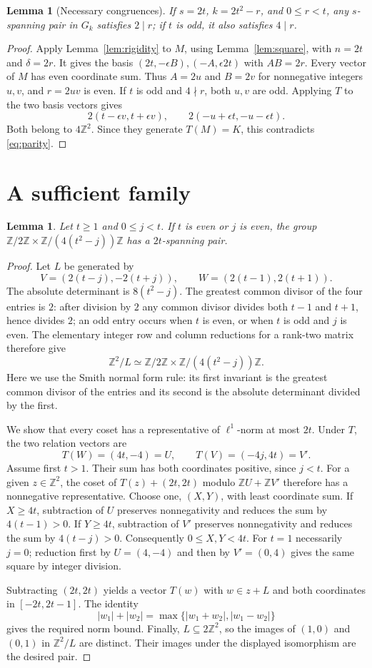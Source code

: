 \documentclass[11pt]{article}
\newtheorem{lemma}[theorem]{Lemma}
\newcommand{\Z}{\mathbb Z}
\newcommand{\Gk}{G_k}
\begin{document}
\begin{lemma}[Necessary congruences]\label{lem:necessity}
If $s=2t$, $k=2t^2-r$, and $0\le r<t$, any $s$-spanning pair in
$\Gk$ satisfies $2\mid r$; if $t$ is odd, it also satisfies $4\mid r$.
\end{lemma}
\begin{proof}
Apply Lemma~\ref{lem:rigidity} to $M$, using Lemma~\ref{lem:square},
with $n=2t$ and $\delta=2r$. It gives the basis
$(2t,-\epsilon B),(-A,\epsilon2t)$ with $AB=2r$.
Every vector of $M$ has even coordinate sum. Thus $A=2u$ and $B=2v$
for nonnegative integers $u,v$, and $r=2uv$ is even.
If $t$ is odd and $4\nmid r$, both $u,v$ are odd. Applying $T$ to
the two basis vectors gives
\[
2(t-\epsilon v,t+\epsilon v),\qquad
2(-u+\epsilon t,-u-\epsilon t).
\]
Both belong to $4\Z^2$. Since they generate $T(M)=K$, this contradicts
\eqref{eq:parity}.
\end{proof}

\section{A sufficient family}
\begin{lemma}\label{lem:sufficiency}
Let $t\ge1$ and $0\le j<t$. If $t$ is even or $j$ is even, the group
$\Z/2\Z\times\Z/(4(t^2-j))\Z$ has a $2t$-spanning pair.
\end{lemma}
\begin{proof}
Let $L$ be generated by
\[
V=(2(t-j),-2(t+j)),\qquad W=(2(t-1),2(t+1)).
\]
The absolute determinant is $8(t^2-j)$. The greatest common divisor of
the four entries is $2$: after division by $2$ any common divisor
divides both $t-1$ and $t+1$, hence divides $2$; an odd entry occurs
when $t$ is even, or when $t$ is odd and $j$ is even.
The elementary integer row and column reductions for a rank-two matrix
therefore give
\[
\Z^2/L\simeq\Z/2\Z\times\Z/(4(t^2-j))\Z.
\]
Here we use the Smith normal form rule: its first invariant is the
greatest common divisor of the entries and its second is the absolute
determinant divided by the first.

We show that every coset has a representative of $\ell^1$-norm at most
$2t$. Under $T$, the two relation vectors are
\[
T(W)=(4t,-4)=U,\qquad T(V)=(-4j,4t)=V'.
\]
Assume first $t>1$. Their sum has both coordinates positive, since
$j<t$. For a given $z\in\Z^2$, the coset of $T(z)+(2t,2t)$
modulo $\Z U+\Z V'$ therefore has a nonnegative representative.
Choose one, $(X,Y)$, with least coordinate sum.
If $X\ge4t$, subtraction of $U$ preserves nonnegativity and reduces
the sum by $4(t-1)>0$. If $Y\ge4t$, subtraction of $V'$ preserves
nonnegativity and reduces the sum by $4(t-j)>0$.
Consequently $0\le X,Y<4t$.
For $t=1$ necessarily $j=0$; reduction first by $U=(4,-4)$ and then
by $V'=(0,4)$ gives the same square by integer division.

Subtracting $(2t,2t)$ yields a vector $T(w)$ with $w\in z+L$ and
both coordinates in $[-2t,2t-1]$. The identity
\[
|w_1|+|w_2|=\max\{|w_1+w_2|,|w_1-w_2|\}
\]
gives the required norm bound. Finally, $L\subseteq2\Z^2$, so the
images of $(1,0)$ and $(0,1)$ in $\Z^2/L$ are distinct.
Their images under the displayed isomorphism are the desired pair.
\end{proof}
\end{document}
